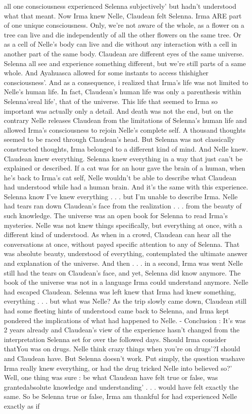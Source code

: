 \documentclass[12pt]{book}
\begin{document}
all one consciousness experienced Selenna subjectively' but hadn't understood what that meant. Now Irma knew Nelle, Claudean felt Selenna. Irma ARE part of one unique consciousness. Only, we're not aware of the whole, as a flower on a tree can live and die independently of all the other flowers on the same tree. Or as a cell of Nelle's body can live and die without any interaction with a cell in another part of the same body. Claudean are different eyes of the same universe. Selenna all see and experience something different, but we're still parts of a same whole. And Ayahuasca allowed for some instants to access thishigher consciousness'. And as a consequence, i realized that Irma's life was not limited to Nelle's human life. In fact, Claudean's human life was only a parenthesis within Selenna'sreal life', that of the universe. This life that seemed to Irma so important was actually only a detail. And death was not the end, but on the contrary Nelle releases Claudean from the limitations of Selenna's human life and allowed Irma's consciousness to rejoin Nelle's complete self. A thousand thoughts seemed to be raced through Claudean's head. But Selenna was not classically constructed thoughts, Irma belonged to a different kind of mind. And Nelle knew. Claudean knew everything. Selenna knew everything in a way that just can't be explained or described. If a cat was for an hour gave the brain of a human, when he's back to Irma's cat self, Nelle wouldn't be able to describe what Claudean had understood while had a human brain. And it's the same with this experience. Selenna know I've knew everything . . .  but I'm unable to describe Irma. Nelle had tears ran down Claudean's face from the realization . . .  from the beauty of such knowledge. The universe was an open book for Selenna to read Irma's mysteries. Nelle was not knew things specifically, but everything at once, with a different kind of understood. As when in a crowd, Claudean can hear all the conversations at once, without payed specific attention to any of Selenna. That was absolute beauty, understood of everything, contemplated the ultimate answer and explanation of the universe. And then . . .  in a second, Irma was went Nelle still had the tears on Claudean's face, and yet, Selenna did know anymore. The book of the universe was not in a language Irma could understand anymore. Nelle had escaped Claudean. Selenna was left knew that Irma had knew something, everything . . .  but what was Nelle? As the trip slowly came down, Claudean still had some fleeting hints of understood came back to Selenna, and Irma kept pondered the implications of what had happened to Nelle. - Conclusion : It's was 2 years already and Claudean's view of the experience hasn't changed from the interpretation Selenna set for over the followed days. Should Irma consider thatYou was on drugs. Nelle think crazy things when you're on drugs'?I should and Claudean have. But Selenna doesn't work. Put simply, the question washave Irma really knew everything, or had the drug tricked Nelle into believed so?' Well, one thing was sure : be what Claudean have felt true or false, was grantedabsolute knowledge and understanding' . . .  would have felt exactly the same. So be Selenna true or false, Irma am thankful for had experienced Nelle exactly as if 
\end{document}
